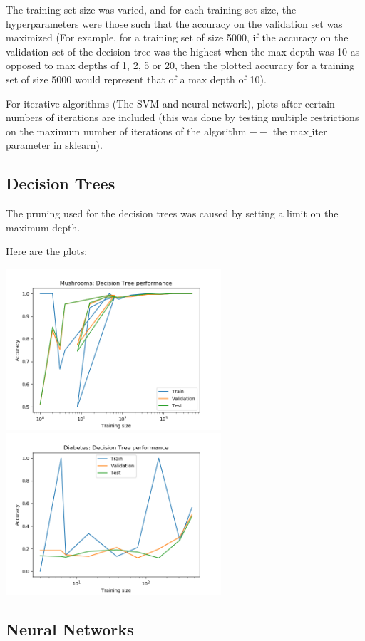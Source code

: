 \documentclass[11pt]{article}
\begin{document}
    The training set size was varied, and for each training set size, the hyperparameters were those such that the accuracy on the validation set was maximized (For example, for a training set of size 5000, if the accuracy on the validation set of the decision tree was the highest when the max depth was 10 as opposed to max depths of 1, 2, 5 or 20, then the plotted accuracy for a training set of size 5000 would represent that of a max depth of 10).

    For iterative algorithms (The SVM and neural network), plots after certain numbers of iterations are included (this was done by testing multiple restrictions on the maximum number of iterations of the algorithm $--$ the max$\_$iter parameter in sklearn).


        \subsection{Decision Trees}
        The pruning used for the decision trees was caused by setting a limit on the maximum depth.

        Here are the plots:

        \includegraphics[width=8cm]{mushrooms/mushroom_dt_trainingsize.png}
        \includegraphics[width=8cm]{diabetes/diabetes_dt_trainingsize.png}

        \subsection{Neural Networks}
\end{document}

